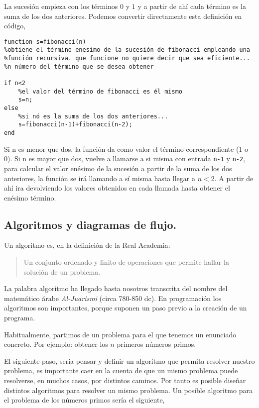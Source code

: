 La sucesión empieza con los términos $0$ y $1$ y a partir de ahí cada término es la suma de los dos anteriores. Podemos convertir directamente esta definición en código,

\begin{verbatim}
function s=fibonacci(n)
%obtiene el término enesimo de la sucesión de fibonacci empleando una
%función recursiva. que funcione no quiere decir que sea eficiente...
%n número del término que se desea obtener

if n<2
    %el valor del término de fibonacci es él mismo
    s=n; 
else
    %si nó es la suma de los dos anteriores...
    s=fibonacci(n-1)+fibonacci(n-2);
end   
\end{verbatim}

Si n es menor que dos, la función da como valor el término correspondiente (1 o 0). Si n es mayor que dos, vuelve a llamarse a si misma con entrada \texttt{n-1} y \texttt{n-2}, para calcular el valor enésimo de la sucesión a partir de la suma de los dos anteriores, la función se irá llamando a sí misma hasta  llegar a $n<2$. A partir de ahí ira devolviendo los valores obtenidos en cada llamada hasta obtener el enésimo término.

\subsection{Algoritmos y diagramas de flujo.} 
Un algoritmo es, en la definición de la Real Academia: 
\begin{quotation}
Un conjunto ordenado y finito de operaciones que permite hallar la solución de un problema.
\end{quotation}

La palabra algoritmo ha llegado hasta nosotros transcrita del nombre del matemático árabe \emph{Al-Juarismi} (circa 780-850 dc). En programación los algoritmos son importantes, porque suponen un paso previo a la creación de un programa.

Habitualmente, partimos de un problema para el que tenemos un enunciado concreto. Por ejemplo: obtener los $n$ primeros números primos. 

El siguiente paso, sería pensar y definir un algoritmo que permita resolver nuestro problema, es importante caer en la cuenta de que un mismo problema puede resolverse, en muchos casos, por distintos caminos. Por tanto es posible diseñar distintos algoritmos para resolver un mismo problema. Un posible algoritmo para el problema de los números primos sería el siguiente,

